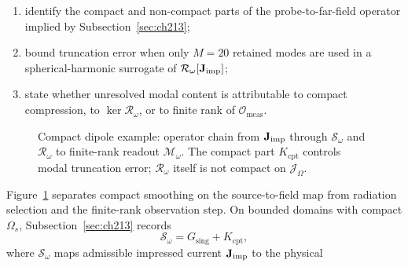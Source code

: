 \begin{enumerate}
\item[(a)] identify the compact and non-compact parts of the probe-to-far-field operator implied by
Subsection~\ref{sec:ch213};
\item[(b)] bound truncation error when only \(M=20\) retained modes are used in a spherical-harmonic
surrogate of \(\mathcal{R}_\omega[\mathbf{J}_{\mathrm{imp}}]\);
\item[(c)] state whether unresolved modal content is attributable to compact compression, to
\(\ker\mathcal{R}_\omega\), or to finite rank of \(\mathcal{O}_{\mathrm{meas}}\).
\end{enumerate} \begin{figure}[t]
\centering
{}
\caption{Compact dipole example: operator chain from $\mathbf{J}_{\mathrm{imp}}$ through $\mathcal{S}_\omega$ and
$\mathcal{R}_\omega$ to finite-rank readout $\mathcal{M}_\omega$. The compact part
$K_{\mathrm{cpt}}$ controls modal truncation error; $\mathcal{R}_\omega$ itself is not compact
on $\mathcal{J}_\Omega$.}
\label{fig:ch2.wp-compact-radiation-probes}
\end{figure}
Figure~\ref{fig:ch2.wp-compact-radiation-probes} separates compact smoothing on the
source-to-field map from radiation selection and the finite-rank observation step.
On bounded domains with compact \(\Omega_s\), Subsection~\ref{sec:ch213} records
\begin{equation}
\label{eq:ch2.ex-compact-green-split}
\mathcal{S}_\omega
=
G_{\mathrm{sing}}+K_{\mathrm{cpt}},
\end{equation}
where $\mathcal{S}_\omega$ maps admissible impressed current $\mathbf{J}_{\mathrm{imp}}$ to the physical
